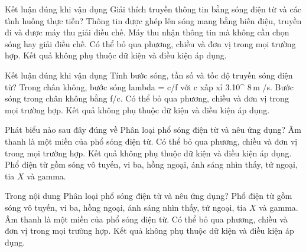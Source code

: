 \begin{ex}
Kết luận đúng khi vận dụng Giải thích truyền thông tin bằng sóng điện từ và các tình huống thực tiễn?
\choice
{\True Thông tin được ghép lên sóng mang bằng biến điệu, truyền đi và được máy thu giải điều chế.}
{Máy thu nhận thông tin mà không cần chọn sóng hay giải điều chế.}
{Có thể bỏ qua phương, chiều và đơn vị trong mọi trường hợp.}
{Kết quả không phụ thuộc dữ kiện và điều kiện áp dụng.}
\end{ex}

\begin{ex}
Kết luận đúng khi vận dụng Tính bước sóng, tần số và tốc độ truyền sóng điện từ?
\choice
{\True Trong chân không, bước sóng lambda = c/f với c xấp xỉ 3.10^ $8\,\text{m}$ /s.}
{Bước sóng trong chân không bằng f/c.}
{Có thể bỏ qua phương, chiều và đơn vị trong mọi trường hợp.}
{Kết quả không phụ thuộc dữ kiện và điều kiện áp dụng.}
\end{ex}

\begin{ex}
Phát biểu nào sau đây đúng về Phân loại phổ sóng điện từ và nêu ứng dụng?
\choice
{Âm thanh là một miền của phổ sóng điện từ.}
{Có thể bỏ qua phương, chiều và đơn vị trong mọi trường hợp.}
{Kết quả không phụ thuộc dữ kiện và điều kiện áp dụng.}
{\True Phổ điện từ gồm sóng vô tuyến, vi ba, hồng ngoại, ánh sáng nhìn thấy, tử ngoại, tia $X$ và gamma.}
\end{ex}

\begin{ex}
Trong nội dung Phân loại phổ sóng điện từ và nêu ứng dụng?
\choice
{\True Phổ điện từ gồm sóng vô tuyến, vi ba, hồng ngoại, ánh sáng nhìn thấy, tử ngoại, tia $X$ và gamma.}
{Âm thanh là một miền của phổ sóng điện từ.}
{Có thể bỏ qua phương, chiều và đơn vị trong mọi trường hợp.}
{Kết quả không phụ thuộc dữ kiện và điều kiện áp dụng.}
\end{ex}

